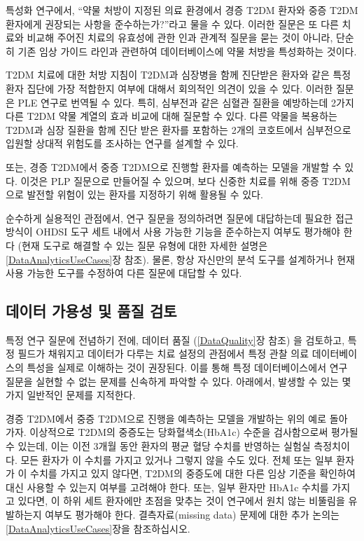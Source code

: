 \documentclass[11pt]{book}
\theoremstyle{definition}
\theoremstyle{definition}
\theoremstyle{definition}
\theoremstyle{remark}
\begin{document}
특성화 연구에서, ``약물 처방이 지정된 의료 환경에서 경증 T2DM 환자와
중증 T2DM 환자에게 권장되는 사항을 준수하는가?''라고 물을 수 있다.
이러한 질문은 또 다른 치료와 비교해 주어진 치료의 유효성에 관한 인과
관계적 질문을 묻는 것이 아니라, 단순히 기존 임상 가이드 라인과 관련하여
데이터베이스에 약물 처방을 특성화하는 것이다.

T2DM 치료에 대한 처방 지침이 T2DM과 심장병을 함께 진단받은 환자와 같은
특정 환자 집단에 가장 적합한지 여부에 대해서 회의적인 의견이 있을 수
있다. 이러한 질문은 PLE 연구로 번역될 수 있다. 특히, 심부전과 같은
심혈관 질환을 예방하는데 2가지 다른 T2DM 약물 계열의 효과 비교에 대해
질문할 수 있다. 다른 약물을 복용하는 T2DM과 심장 질환을 함께 진단 받은
환자를 포함하는 2개의 코호트에서 심부전으로 입원할 상대적 위험도를
조사하는 연구를 설계할 수 있다.

또는, 경증 T2DM에서 중증 T2DM으로 진행할 환자를 예측하는 모델을 개발할
수 있다. 이것은 PLP 질문으로 만들어질 수 있으며, 보다 신중한 치료를 위해
중증 T2DM으로 발전할 위험이 있는 환자를 지정하기 위해 활용될 수 있다.

순수하게 실용적인 관점에서, 연구 질문을 정의하려면 질문에 대답하는데
필요한 접근 방식이 OHDSI 도구 세트 내에서 사용 가능한 기능을 준수하는지
여부도 평가해야 한다 (현재 도구로 해결할 수 있는 질문 유형에 대한 자세한
설명은 \ref{DataAnalyticsUseCases}장 참조). 물론, 항상 자신만의 분석
도구를 설계하거나 현재 사용 가능한 도구를 수정하여 다른 질문에 대답할 수
있다.

\subsection{데이터 가용성 및 품질 검토}\label{----}

특정 연구 질문에 전념하기 전에, 데이터 품질 (\ref{DataQuality}장 참조)
을 검토하고, 특정 필드가 채워지고 데이터가 다루는 치료 설정의 관점에서
특정 관찰 의료 데이터베이스의 특성을 실제로 이해하는 것이 권장된다. 이를
통해 특정 데이터베이스에서 연구 질문을 실현할 수 없는 문제를 신속하게
파악할 수 있다. 아래에서, 발생할 수 있는 몇 가지 일반적인 문제를
지적한다.

경증 T2DM에서 중증 T2DM으로 진행을 예측하는 모델을 개발하는 위의 예로
돌아 가자. 이상적으로 T2DM의 중증도는 당화혈색소(HbA1c) 수준을
검사함으로써 평가될 수 있는데, 이는 이전 3개월 동안 환자의 평균 혈당
수치를 반영하는 실험실 측정치이다. 모든 환자가 이 수치를 가지고 있거나
그렇지 않을 수도 있다. 전체 또는 일부 환자가 이 수치를 가지고 있지
않다면, T2DM의 중증도에 대한 다른 임상 기준을 확인하여 대신 사용할 수
있는지 여부를 고려해야 한다. 또는, 일부 환자만 HbA1c 수치를 가지고
있다면, 이 하위 세트 환자에만 초점을 맞추는 것이 연구에서 원치 않는
비뚤림을 유발하는지 여부도 평가해야 한다. 결측자료(missing data) 문제에
대한 추가 논의는 \ref{DataAnalyticsUseCases}장을 참조하십시오.
\end{document}
